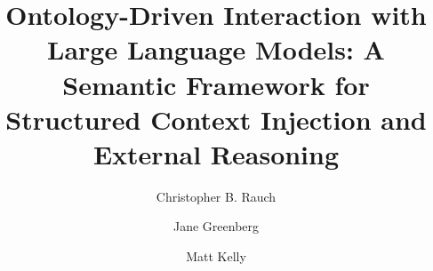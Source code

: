 \documentclass[sigconf,anonymous]{acmart}
\begin{document}
\title{Ontology-Driven Interaction with Large Language Models: A Semantic Framework for Structured Context Injection and External Reasoning}

\author{Christopher B. Rauch}

\author{Jane Greenberg}

\author{Matt Kelly}


\renewcommand{\shortauthors}{Rauch et al.}
\end{document}
